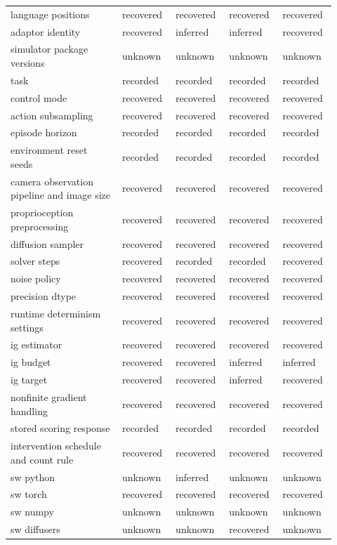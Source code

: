 \begin{longtable}{p{0.320\linewidth} p{0.150\linewidth} p{0.150\linewidth} p{0.150\linewidth} p{0.150\linewidth}}
language positions & recovered & recovered & recovered & recovered \\
adaptor identity & recovered & inferred & inferred & recovered \\
simulator package versions & unknown & unknown & unknown & unknown \\
task & recorded & recorded & recorded & recorded \\
control mode & recovered & recovered & recovered & recovered \\
action subsampling & recovered & recovered & recovered & recovered \\
episode horizon & recorded & recorded & recorded & recorded \\
environment reset seeds & recorded & recorded & recorded & recorded \\
camera observation pipeline and image size & recovered & recovered & recovered & recovered \\
proprioception preprocessing & recovered & recovered & recovered & recovered \\
diffusion sampler & recovered & recovered & recovered & recovered \\
solver steps & recovered & recorded & recorded & recovered \\
noise policy & recovered & recovered & recovered & recovered \\
precision dtype & recovered & recovered & recovered & recovered \\
runtime determinism settings & recovered & recovered & recovered & recovered \\
ig estimator & recovered & recovered & recovered & recovered \\
ig budget & recovered & recovered & inferred & inferred \\
ig target & recovered & recovered & inferred & recovered \\
nonfinite gradient handling & recovered & recovered & recovered & recovered \\
stored scoring response & recorded & recorded & recorded & recorded \\
intervention schedule and count rule & recovered & recovered & recovered & recovered \\
sw python & unknown & inferred & unknown & unknown \\
sw torch & recovered & recovered & recovered & recovered \\
sw numpy & unknown & unknown & unknown & unknown \\
sw diffusers & unknown & unknown & recovered & unknown \\

\end{longtable}
